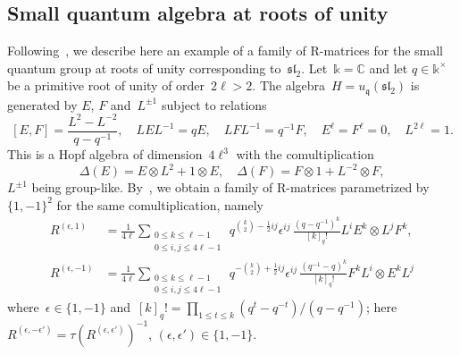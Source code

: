 \documentclass[12pt, reqno]{amsart}
\theoremstyle{definition}
\numberwithin{equation}{section}
\newcommand{\tensor}{\otimes}
\newcommand{\kk}{\mathbb{k}}\newcommand{\lie}[1]{{\mathfrak{#1}}}
\begin{document}
\subsection{Small quantum algebra at roots of unity}
\label{subs:small quantum}
Following~\cite{LN}, we describe here an example of a family of
R-matrices for the small quantum group at roots of unity corresponding 
to~$\lie{sl}_2$. Let~$\kk=\mathbb C$ and let $q\in\kk^\times$ be a primitive root of unity of order~$2\ell>2$. 
The algebra~$H=u_{\lie q}(\lie{sl}_2)$
is generated by $E$, $F$ and~$L^{\pm 1}$  subject to relations
$$
[E,F]=\frac{L^2-L^{-2}}{q-q^{-1}},\quad 
LE L^{-1}=q E,\quad 
LF L^{-1}=q^{-1}F,\quad E^{\ell}=F^{\ell}=0,\quad 
L^{2\ell}=1.
$$
This is a Hopf algebra of dimension~$4\ell^3$ with the comultiplication
$$
\Delta(E)=E\tensor L^2+1\tensor E,\quad 
\Delta(F)=F\tensor 1+L^{-2}\tensor F,
$$
$L^{\pm1}$ being group-like. By~\cite{LN}, we obtain a 
family of R-matrices parametrized by~$\{1,-1\}^2$ for the same comultiplication, namely
\begin{align*}
R^{(\epsilon,1)}&=\frac1{4\ell}\sum_{\substack{0\le k\le \ell-1\\
0\le i,j\le 4\ell-1}}\, q^{\binom{k}2-\frac12 ij}\epsilon^{ij}\,
\frac{(q-q^{-1})^{k}}{[k]_q!}
 L^{i} E^k \tensor  L^{j}F^k,\\
R^{(\epsilon,-1)}&=\frac1{4\ell}\sum_{\substack{0\le k\le \ell-1\\
0\le i,j\le 4\ell-1}}\, q^{-\binom{k}2+\frac12 ij}\epsilon^{ij}\,
\frac{(q^{-1}-q)^{k}}{[k]_q!}
 F^k L^{i} \tensor  E^k L^{j}
\end{align*}
where~$\epsilon\in\{1,-1\}$ and~$[k]_q!=\prod_{1\le t\le k}(q^t-q^{-t})/(q-q^{-1})$; here~$R^{(\epsilon,-\epsilon')}=\tau(R^{(\epsilon,\epsilon')})^{-1}$, $(\epsilon,\epsilon')\in \{1,-1\}$.
\end{document}
